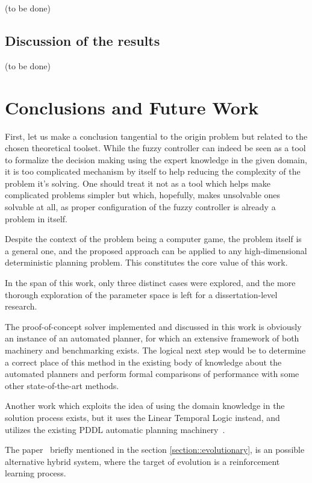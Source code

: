 \documentclass[12pt, a4paper]{article}
\begin{document}
	(to be done)
	
		\subsection{Discussion of the results}
		(to be done)


	
	\section{Conclusions and Future Work}

	First, let us make a conclusion tangential to the origin problem but related to the chosen theoretical toolset.
	While the fuzzy controller can indeed be seen as a tool to formalize the decision making using the expert knowledge in the given domain, it is too complicated mechanism by itself to help reducing the complexity of the problem it's solving.
	One should treat it not as a tool which helps make complicated problems simpler but which, hopefully, makes unsolvable ones solvable at all, as proper configuration of the fuzzy controller is already a problem in itself.

	Despite the context of the problem being a computer game, the problem itself is a general one, and the proposed approach can be applied to any high-dimensional deterministic planning problem.
	This constitutes the core value of this work.

	In the span of this work, only three distinct cases were explored, and the more thorough exploration of the parameter space is left for a dissertation-level research.

	The proof-of-concept solver implemented and discussed in this work is obviously an instance of an automated planner, for which an extensive framework of both machinery and benchmarking exists.
	The logical next step would be to determine a correct place of this method in the existing body of knowledge about the automated planners and perform formal comparisons of performance with some other state-of-the-art methods.

	Another work which exploits the idea of using the domain knowledge in the solution process exists, but it uses the Linear Temporal Logic instead, and utilizes the existing PDDL automatic planning machinery~\cite{LU2025121666}.

	The paper~\cite{song2023rl_ea} briefly mentioned in the section \ref{section::evolutionary}, is an possible alternative hybrid system, where the target of evolution is a reinforcement learning process.

	\printbibliography
\end{document}
